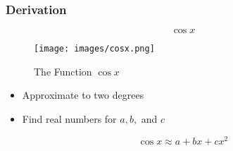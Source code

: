 \documentclass{beamer}
\begin{document}
\begin{frame}
  \frametitle{Derivation}
  \begin{equation*}
    \cos x
  \end{equation*}
  \begin{figure}[ht]
    \centering
    \caption{The Function \( \cos x \)}
    \texttt{[image: images/cosx.png]}
  \end{figure}
  \begin{itemize}
    \item Approximate to two degrees
    \item Find real numbers for \( a, b, \) and \( c \)
  \end{itemize}
  \begin{equation*}
    \cos x \approx a + bx + cx^2
  \end{equation*}
\end{frame}
\end{document}
